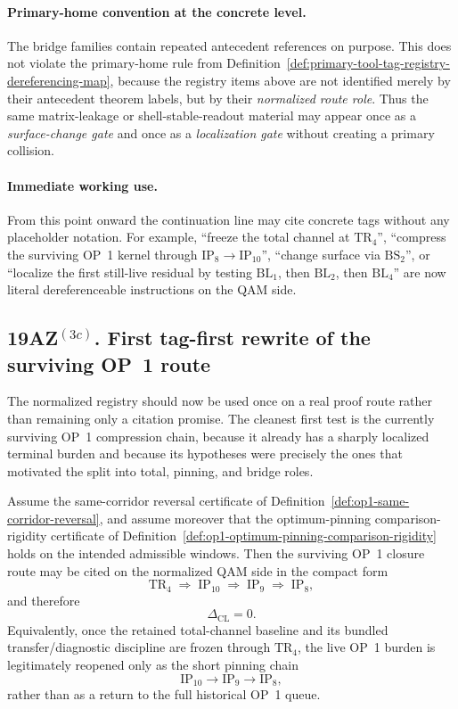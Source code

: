 \paragraph{Primary-home convention at the concrete level.}
The bridge families contain repeated antecedent references on purpose. This does not violate the primary-home rule from Definition~\ref{def:primary-tool-tag-registry-dereferencing-map}, because the registry items above are not identified merely by their antecedent theorem labels, but by their \emph{normalized route role}. Thus the same matrix-leakage or shell-stable-readout material may appear once as a \emph{surface-change gate} and once as a \emph{localization gate} without creating a primary collision.

\paragraph{Immediate working use.}
From this point onward the continuation line may cite concrete tags without any placeholder notation. For example, ``freeze the total channel at $\mathrm{TR}_4$'', ``compress the surviving OP~1 kernel through $\mathrm{IP}_8\to \mathrm{IP}_{10}$'', ``change surface via $\mathrm{BS}_2$'', or ``localize the first still-live residual by testing $\mathrm{BL}_1$, then $\mathrm{BL}_2$, then $\mathrm{BL}_4$'' are now literal dereferenceable instructions on the QAM side.


\subsection*{19AZ$^{(3c)}$. First tag-first rewrite of the surviving OP~1 route}
\label{sec:first-tag-first-rewrite-of-the-surviving-op1-route}
The normalized registry should now be used once on a real proof route rather than remaining only a citation promise. The cleanest first test is the currently surviving OP~1 compression chain, because it already has a sharply localized terminal burden and because its hypotheses were precisely the ones that motivated the split into total, pinning, and bridge roles.

\begin{proposition}
\label{prop:first-tag-first-op1-route}
Assume the same-corridor reversal certificate of Definition~\ref{def:op1-same-corridor-reversal}, and assume moreover that the optimum-pinning comparison-rigidity certificate of Definition~\ref{def:op1-optimum-pinning-comparison-rigidity} holds on the intended admissible windows. Then the surviving OP~1 closure route may be cited on the normalized QAM side in the compact form
\[
  \mathrm{TR}_4 \;\Longrightarrow\; \mathrm{IP}_{10} \;\Longrightarrow\; \mathrm{IP}_9 \;\Longrightarrow\; \mathrm{IP}_8,
\]
and therefore
\[
  \Delta_{\mathrm{CL}} = 0.
\]
Equivalently, once the retained total-channel baseline and its bundled transfer/diagnostic discipline are frozen through \(\mathrm{TR}_4\), the live OP~1 burden is legitimately reopened only as the short pinning chain
\[
  \mathrm{IP}_{10} \to \mathrm{IP}_9 \to \mathrm{IP}_8,
\]
rather than as a return to the full historical OP~1 queue.
\end{proposition}

